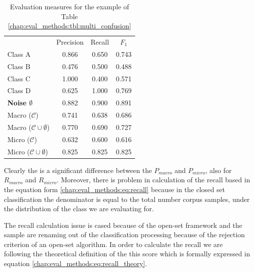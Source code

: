 \begin{table}[t]
	\center
	\caption{Evaluation measures for the example of Table \ref{chap:eval_methods:tbl:multi_confusion}}\label{chap:eval_methods:tbl:macro_vs_micro}
	\begin{tabular}{c c c c}
		\cline{2-4}
		& \multicolumn{1}{|c}{Precision} & \multicolumn{1}{c}{Recall} & \multicolumn{1}{c|}{$F_{1}$}\\
		\cline{1-4}
		\multicolumn{1}{|l}{Class A} & \multicolumn{1}{|c}{0.866} & \multicolumn{1}{c}{0.650} & \multicolumn{1}{c|}{0.743}\\
		\multicolumn{1}{|l}{Class B} & \multicolumn{1}{|c}{0.476} & \multicolumn{1}{c}{0.500} & \multicolumn{1}{c|}{0.488}\\
		\multicolumn{1}{|l}{Class C} & \multicolumn{1}{|c}{1.000} & \multicolumn{1}{c}{0.400} & \multicolumn{1}{c|}{0.571}\\
		\multicolumn{1}{|l}{Class D} & \multicolumn{1}{|c}{0.625} & \multicolumn{1}{c}{1.000} & \multicolumn{1}{c|}{0.769}\\
		\multicolumn{1}{|l}{\textbf{Noise $\emptyset$}} & \multicolumn{1}{|c}{0.882} & \multicolumn{1}{c}{0.900} & \multicolumn{1}{c|}{0.891}\\
		\cline{1-4}
		\multicolumn{1}{|l}{Macro ($\mathcal{C}$)} & \multicolumn{1}{|c}{0.741} & \multicolumn{1}{c}{0.638} & \multicolumn{1}{c|}{0.686}\\
		\multicolumn{1}{|l}{Macro ($\mathcal{C} \cup \emptyset$)} & \multicolumn{1}{|c}{0.770} & \multicolumn{1}{c}{0.690} & \multicolumn{1}{c|}{0.727}\\
		\multicolumn{1}{|l}{Micro ($\mathcal{C}$)} & \multicolumn{1}{|c}{0.632} & \multicolumn{1}{c}{0.600} & \multicolumn{1}{c|}{0.616}\\
		\multicolumn{1}{|l}{Micro ($\mathcal{C} \cup \emptyset$)} & \multicolumn{1}{|c}{0.825} & \multicolumn{1}{c}{0.825} & \multicolumn{1}{c|}{0.825}\\
		\cline{1-4}
	\end{tabular}
\end{table}

Clearly the is a significant difference between the $P_{macro}$ and $P_{micro}$, also for $R_{macro}$ and $R_{micro}$. Moreover, there is problem in calculation of the recall based in the equation form \ref{chap:eval_methods:eq:recall} because in the closed set classification the denominator is equal to the total number corpus samples, under the distribution of the class we are evaluating for. 

The recall calculation issue is cased because of the open-set framework and the sample are renaming out of the classification processing because of the rejection criterion of an open-set algorithm. In order to calculate the recall we are following the theoretical definition of the this score which is formally expressed in equation \ref{chap:eval_methods:eq:recall_theory}.

